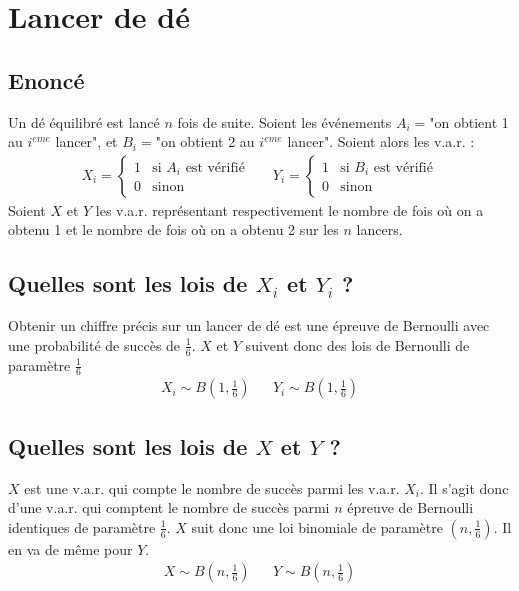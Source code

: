 \documentclass[10pt,a4paper,twoside]{article}
\begin{document}
\section{Lancer de dé}
\subsection*{Enoncé}
Un dé équilibré est lancé $n$ fois de suite. Soient les événements $A_{i}=$"on obtient 1 au $i^{eme}$ lancer", et $B_{i}=$"on obtient 2 au $i^{eme}$ lancer". Soient alors les v.a.r. :
\begin{align*}
X_{i} = \left\lbrace \begin{array}{ll}
1 & \text{si }A_{i}\text{ est vérifié}\\
0 & \text{sinon}
\end{array}\right.
&&
Y_{i} = \left\lbrace \begin{array}{ll}
1 & \text{si }B_{i}\text{ est vérifié}\\
0 & \text{sinon}
\end{array}\right.
\end{align*} 
Soient $X$ et $Y$ les v.a.r. représentant respectivement le nombre de fois où on a obtenu 1 et le nombre de fois où on a obtenu 2 sur les $n$ lancers.


\subsection{Quelles sont les lois de $X_{i}$ et $Y_{i}$ ?}
Obtenir un chiffre précis sur un lancer de dé est une épreuve de Bernoulli avec une probabilité de succès de $\frac{1}{6}$. $X$ et $Y$ suivent donc des lois de Bernoulli de paramètre $\frac{1}{6}$ 
\begin{align*}
X_{i} \sim B\left(1,\frac{1}{6}\right) && Y_{i} \sim B\left(1,\frac{1}{6}\right)
\end{align*}

\subsection{Quelles sont les lois de $X$ et $Y$ ?}
$X$ est une v.a.r. qui compte le nombre de succès parmi les v.a.r. $X_{i}$. Il s'agit donc d'une v.a.r. qui comptent le nombre de succès parmi $n$ épreuve de Bernoulli identiques de paramètre $\frac{1}{6}$. $X$ suit donc une loi binomiale de paramètre $(n,\frac{1}{6})$. Il en va de même pour $Y$.
\begin{align*}
X \sim B\left(n,\frac{1}{6}\right) && Y \sim B\left(n,\frac{1}{6}\right)
\end{align*}
\end{document}
